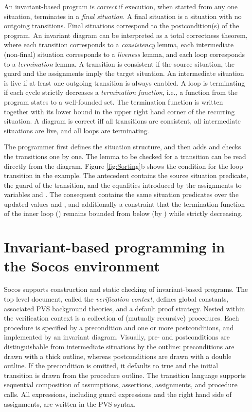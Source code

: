 \documentclass[english,submission]{eptcs}
\begin{document}
An invariant-based program is \emph{correct} if execution, when
started from any one situation, terminates in a \emph{final
  situation}. A final situation is a situation with no outgoing
transitions. Final situations correspond to the postcondition(s) of the
program. An invariant diagram can be interpreted as a total
correctness theorem, where each transition corresponds to a
\emph{consistency} lemma, each intermediate (non-final) situation
corresponds to a \emph{liveness} lemma, and each loop corresponds to a
\emph{termination} lemma. A transition is consistent if the source
situation, the guard and the assignments imply the target situation.
An intermediate situation is live if at least one outgoing transition
is always enabled. A loop is terminating if each cycle strictly
decreases a \emph{termination function}, i.e., a function from the
program states to a well-founded set.  The termination function is
written together with its lower bound in the upper right hand corner
of the recurring situation. A diagram is correct iff all transitions
are consistent, all intermediate situations are live, and all loops
are terminating.

The programmer first defines the situation structure, and then adds
and checks the transitions one by one. The lemma to be checked for a
transition can be read directly from the diagram. Figure
\ref{fig:Sorting}b shows the condition for the loop transition in the
example. The antecedent contains the source situation predicate, the
guard of the transition, and the equalities introduced by the
assignments to variables  and . The consequent contains the same
situation predicates over the updated values  and , and
additionally a constraint that the termination function of the inner
loop () remains bounded from below (by ) while strictly
decreasing.


\section{Invariant-based programming in the Socos environment\label{sec:Invariant-based-programming-in-Socos}}

Socos supports construction and static checking of invariant-based
programs. The top level document, called the \emph{verification
context}, defines global constants, associated PVS background
theories, and a default proof strategy. Nested within the verification
context is a collection of (mutually recursive) procedures. Each
procedure is specified by a precondition and one or more
postconditions, and implemented by an invariant diagram. Visually,
pre- and postconditions are distinguishable from intermediate
situations by the outline: preconditions are drawn with a thick
outline, whereas postconditions are drawn with a double outline. If
the precondition is omitted, it defaults to true and the initial
transition is drawn from the procedure outline. The transition
language supports sequential composition of assumptions, assertions,
assignments, and procedure calls. All expressions, including guard
expressions and the right hand side of assignments, are written in the
PVS syntax.
\end{document}
